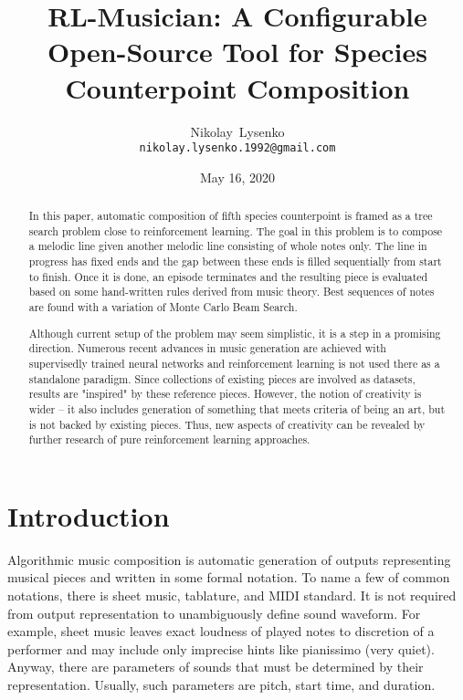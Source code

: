 \documentclass{article}
\title{RL-Musician: A Configurable Open-Source Tool for Species Counterpoint Composition}
\date{May 16, 2020}
\author{
  Nikolay~Lysenko\\
  \texttt{nikolay.lysenko.1992@gmail.com} \\
}
\begin{document}
\maketitle

\begin{abstract}
In this paper, automatic composition of fifth species counterpoint is framed as a tree search problem close to reinforcement learning. The goal in this problem is to compose a melodic line given another melodic line consisting of whole notes only. The line in progress has fixed ends and the gap between these ends is filled sequentially from start to finish. Once it is done, an episode terminates and the resulting piece is evaluated based on some hand-written rules derived from music theory. Best sequences of notes are found with a variation of Monte Carlo Beam Search.

Although current setup of the problem may seem simplistic, it is a step in a promising direction. Numerous recent advances in music generation are achieved with supervisedly trained neural networks and reinforcement learning is not used there as a standalone paradigm. Since collections of existing pieces are involved as datasets, results are "inspired" by these reference pieces. However, the notion of creativity is wider -- it also includes generation of something that meets criteria of being an art, but is not backed by existing pieces. Thus, new aspects of creativity can be revealed by further research of pure reinforcement learning approaches.
\end{abstract}



\section{Introduction}
\label{sec:introduction}

Algorithmic music composition is automatic generation of outputs representing musical pieces and written in some formal notation. To name a few of common notations, there is sheet music, tablature, and MIDI standard. It is not required from output representation to unambiguously define sound waveform. For example, sheet music leaves exact loudness of played notes to discretion of a performer and may include only imprecise hints like pianissimo (very quiet). Anyway, there are parameters of sounds that must be determined by their representation. Usually, such parameters are pitch, start time, and duration.
\end{document}
